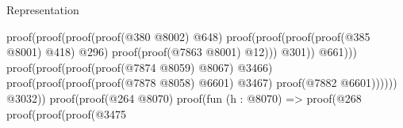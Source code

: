 \begin{lexlean}{Representation}
\begin{coremodule}
                                                                                        proof(proof(proof(proof(@380
                                                                                                  @8002)
                                                                                                @648)
                                                                                              proof(proof(proof(proof(@385
                                                                                                        @8001)
                                                                                                      @418)
                                                                                                    @296)
                                                                                                  proof(proof(@7863
                                                                                                        @8001)
                                                                                                      @12)))
                                                                                            @301))
                                                                                      @661)))
                                                                            proof(proof(proof(proof(@7874
                                                                                      @8059)
                                                                                    @8067)
                                                                                  @3466)
                                                                                proof(proof(proof(proof(@7878
                                                                                          @8058)
                                                                                        @6601)
                                                                                      @3467)
                                                                                    proof(@7882
                                                                                        @6601))))))
                                                                  @3032))
                                                            proof(proof(@264 @8070)
                                                                proof(fun (h : @8070) =>
                                                                  proof(@268
                                                                      proof(proof(proof(@3475

\end{coremodule}
\end{lexlean}
